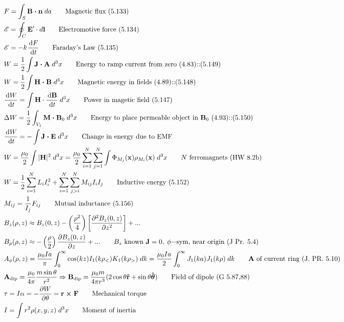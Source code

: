 \documentclass[10pt]{article}
\newcommand{\rhat}{\boldsymbol{\hat{\textbf{r}}}}
\newcommand{\thetahat}{\boldsymbol{\hat{\textbf{$\theta$}}}}
\newcommand{\ve}[1]{\boldsymbol{\mathbf{#1}}}
\newcommand{\vect}[1]{\boldsymbol{\mathbf{#1}}}
\newcommand{\dd}{\, \mathrm{d}}
\newcommand{\tder}[2]{\frac{\dd #1}{\dd #2}}
\newcommand{\pder}[2]{\frac{\partial #1}{\partial #2}}
\newcommand{\dpder}[2]{\frac{\partial^2 #1}{\partial #2^2}}
\begin{document}
\begin{multicols}{2}
\begin{align*}
		& F = \int_S \vect{B \cdot n} \; da \tag*{Magnetic flux (5.133)} \\
		& \mathscr{E} = \oint_C \vect{E}' \cdot d \vect{l} \tag*{Electromotive force (5.134)} \\
		& \mathscr{E} = -k \tder{F}{t} \tag*{Faraday's Law (5.135)} \\
		& W = \frac{1}{2} \int \vect{J \cdot A} \; d^3 x  \tag*{Energy to ramp current from zero (4.83)::(5.149)} \\
		& W = \frac{1}{2} \int \vect{H \cdot B} \; d^3 x \tag*{Magnetic energy in fields (4.89)::(5.148)} \\
		& \tder{W}{t} = \int \ve{H} \cdot \tder{\ve{B}}{t} \; d^3 x \tag*{Power in magetic field (5.147)} \\
		& \Delta W = \frac{1}{2} \int_{V_1} \vect{M \cdot B}_0 \; d^3 x \tag*{Energy to place permeable object in $\ve{B}_0$ (4.93)::(5.150)} \\
		& \tder{W}{t} = - \int \ve{J \cdot E} \; d^3 x \tag*{Change in energy due to EMF} \\
		& W = \frac{\mu_0}{2} \int |\ve{H}|^2 \; d^3 x = \frac{\mu_0}{2} \sum_{i=1}^{N} \sum_{j=1}^{N} \int \Phi_{M_j}(\ve{x}) \rho_{M_i}(\ve{x}) \; d^3 x \tag*{$N$ ferromagnets (HW 8.2b)} \\
		& W = \frac{1}{2} \sum_{i=1}^N L_i I_i^2 + \sum_{i=1}^N \sum_{j>i}^N M_{ij} I_i I_j \tag*{Inductive energy (5.152)} \\
		& M_{ij} = \frac{1}{I_j} F_{ij} \tag*{Mutual inductance (5.156)} \\
		& B_z(\rho, z) \approx B_z(0,z) - \left( \frac{\rho^2}{4} \right) \left[ \dpder{B_z(0,z)}{z} \right] + ... \\
		& B_\rho (\rho, z) \approx - \left( \frac{\rho}{2} \right) \pder{B_z(0,z)}{z} + ... \tag*{$B_z$ known $\ve{J} = 0, \; \phi-$sym, near origin (J Pr. 5.4)} \\
		& A_\phi(\rho,z) = \frac{\mu_0 I a}{\pi} \int_0^\infty \cos(kz) I_1 (k \rho_<) K_1(k \rho_>) \; dk = \frac{\mu_0 I a}{2} \int_0^\infty J_1 (ka) J_1 (k \rho) \; dk \tag*{$\ve{A}$ of current ring (J. PR. 5.10)} \\
		&\ve{A}_{\text{dip}} = \frac{\mu_0}{4 \pi} \frac{m \sin \theta}{r^2} \Rightarrow \ve{B}_{\text{dip}} = \frac{\mu_0 m}{4 \pi r^3}(2 \cos \theta \rhat + \sin \theta \thetahat) \tag*{Field of dipole (G 5.87,88)} \\
		& \tau = I \alpha = - \pder{W}{\theta} = \vect{r \times F} \tag*{Mechanical torque}\\
		& I = \int r^2 \rho(x,y,z) \; d^3 x \tag*{Moment of inertia} \\ 

\end{align*}
\end{multicols}
\end{document}
